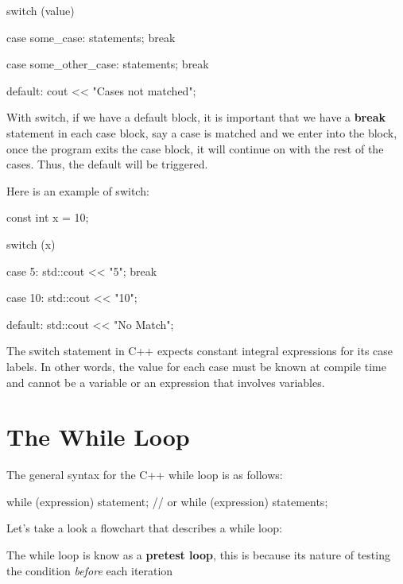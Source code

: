 \documentclass{report}
\begin{document}
    \begin{cppcode}
switch (value){
    case some_case:
        statements;
        break

    case some_other_case:
        statements;
        break

    default:
        cout << "Cases not matched";
}
    \end{cppcode}
    
    \bigbreak \noindent 
    \begin{notebox}
        With switch, if we have a default block, it is important that we have a \textbf{break} statement in each case block, say a case is matched and we enter into the block, once the program exits the case block, it will continue on with the rest of the cases. Thus, the default will be triggered.
    \end{notebox}
    
    \bigbreak \noindent 
    Here is an example of switch:
    \bigbreak \noindent 
    
    \begin{cppcode}
const int x = 10;

switch (x) {
    case 5:
        std::cout << "5";
        break

    case 10:
        std::cout << "10";

    default:
        std::cout << "No Match";
}
    \end{cppcode}
    
    \bigbreak \noindent 
    \begin{notebox}
			The switch statement in C++ expects constant integral expressions for its case labels. In other words, the value for each case must be known at compile time and cannot be a variable or an expression that involves variables.
		\end{notebox}

    \pagebreak \bigbreak \noindent 
    \section{\LARGE The While Loop}
    \bigbreak \noindent 
    The general syntax for the C++ while loop is as follows:
    \bigbreak \noindent 
    
    \begin{cppcode}
while (expression)
    statement;
// or
while (expression) {
    statements;
}
    \end{cppcode}
    
    \bigbreak \noindent 
    \begin{minipage}[]{0.47\textwidth}
        Let's take a look a flowchart that describes a while loop:
    \end{minipage}
    \begin{minipage}[]{0.47\textwidth}
    \end{minipage}
    \bigbreak \noindent 
    \begin{notebox}
        The while loop is know as a \textbf{pretest loop}, this is because its nature of testing the condition \textit{before} each iteration
    \end{notebox}
\end{document}
